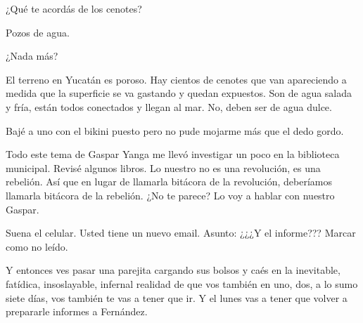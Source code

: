 \documentclass[12pt,twoside,openright,a5paper]{book}
\begin{document}
¿Qué te acordás de los cenotes?

Pozos de agua.

¿Nada más?

El terreno en Yucatán es poroso. Hay cientos de cenotes que van apareciendo a medida
que la superficie se va gastando y quedan expuestos. Son de agua salada
y fría, están todos conectados y llegan al mar. No, deben ser de agua
dulce.

Bajé a uno con el bikini puesto pero no pude mojarme más que el dedo gordo.


\vspace{0.5cm}

\hrulefill\hspace{0.2cm} \decofourleft\decofourright \hspace{0.2cm} \hrulefill
\vspace{0.5cm}

Todo este tema de Gaspar Yanga me llevó investigar un poco en
la biblioteca municipal. Revisé algunos libros. Lo nuestro no es
una revolución, es una rebelión. Así que en lugar de
llamarla bitácora de la revolución, deberíamos llamarla bitácora de la
rebelión. ¿No te parece? Lo voy a hablar con nuestro Gaspar.

\vspace{0.5cm}

\hrulefill\hspace{0.2cm} \decofourleft\decofourright \hspace{0.2cm} \hrulefill
\vspace{0.5cm}

Suena el celular. Usted tiene un nuevo email. Asunto: ¿¿¿Y el informe??? Marcar como no leído.


\vspace{0.5cm}

\hrulefill\hspace{0.2cm} \decofourleft\decofourright \hspace{0.2cm} \hrulefill
\vspace{0.5cm}

Y entonces ves pasar una parejita cargando sus bolsos y caés en la
inevitable, fatídica, insoslayable, infernal realidad de que vos también en
uno, dos, a lo sumo siete días, vos también te vas a tener que ir. Y
el lunes vas a tener que volver a prepararle informes a Fernández.

\vspace{0.5cm}

\hrulefill\hspace{0.2cm} \decofourleft\decofourright \hspace{0.2cm} \hrulefill
\vspace{0.5cm}
\end{document}
